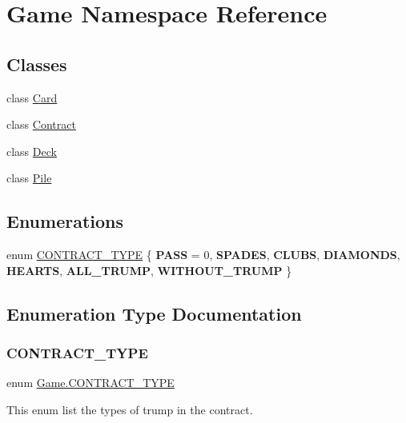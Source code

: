 \hypertarget{namespace_game}{}\section{Game Namespace Reference}
\label{namespace_game}
\subsection*{Classes}
\begin{DoxyCompactItemize}
\item 
class \hyperlink{class_game_1_1_card}{Card}
\item 
class \hyperlink{class_game_1_1_contract}{Contract}
\item 
class \hyperlink{class_game_1_1_deck}{Deck}
\item 
class \hyperlink{class_game_1_1_pile}{Pile}
\end{DoxyCompactItemize}
\subsection*{Enumerations}
\begin{DoxyCompactItemize}
\item 
enum \hyperlink{namespace_game_ae93b4df2175d9820e5d19dc1ab708e7e}{C\+O\+N\+T\+R\+A\+C\+T\+\_\+\+T\+Y\+PE} \{ \newline
{\bfseries P\+A\+SS} = 0, 
{\bfseries S\+P\+A\+D\+ES}, 
{\bfseries C\+L\+U\+BS}, 
{\bfseries D\+I\+A\+M\+O\+N\+DS}, 
\newline
{\bfseries H\+E\+A\+R\+TS}, 
{\bfseries A\+L\+L\+\_\+\+T\+R\+U\+MP}, 
{\bfseries W\+I\+T\+H\+O\+U\+T\+\_\+\+T\+R\+U\+MP}
 \}
\end{DoxyCompactItemize}


\subsection{Enumeration Type Documentation}
\mbox{\label{namespace_game_ae93b4df2175d9820e5d19dc1ab708e7e}} 
\subsubsection{\texorpdfstring{C\+O\+N\+T\+R\+A\+C\+T\+\_\+\+T\+Y\+PE}{CONTRACT\_TYPE}}
{\footnotesize\ttfamily enum \hyperlink{namespace_game_ae93b4df2175d9820e5d19dc1ab708e7e}{Game.\+C\+O\+N\+T\+R\+A\+C\+T\+\_\+\+T\+Y\+PE}\hspace{0.3cm}{\ttfamily [strong]}}

This enum list the types of trump in the contract. 